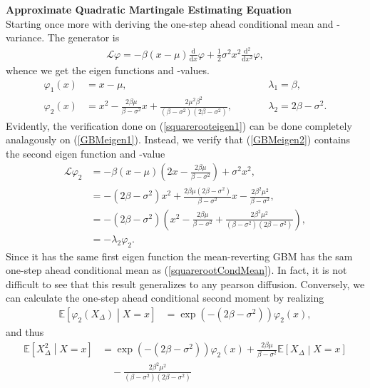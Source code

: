 \noindent \textbf{Approximate Quadratic Martingale Estimating Equation}\\
\noindent Starting once more with deriving the one-step ahead conditional mean and - variance. The generator is
\begin{align}
    \mathcal{L}\varphi = -\beta\left(x - \mu\right)\frac{\mathrm{d}}{\mathrm{d}x}\varphi + \frac{1}{2}\sigma^2 x^2 \frac{\mathrm{d}^2}{\mathrm{d}x^2}\varphi,
\end{align}
whence we get the eigen functions and -values.
\begin{align}
    \varphi_1(x) &= x - \mu, \qquad &&\lambda_1 = \beta, \label{GBMeigen1} \\
    \varphi_2(x) &= x^2 - \frac{2\beta\mu}{\beta - \sigma^2}x + \frac{2\mu^2\beta^2}{\left(\beta - \sigma^2\right)\left(2\beta - \sigma^2\right)}, \qquad &&\lambda_2 = 2\beta - \sigma^2 \label{GBMeigen2}.
\end{align}
Evidently, the verification done on (\ref{squarerooteigen1}) can be done completely analagously on (\ref{GBMeigen1}). Instead, we verify that (\ref{GBMeigen2}) contains the second eigen function and -value
\begin{align}
    \mathcal{L}\varphi_2 & = -\beta\left(x-\mu\right)\left(2x - \frac{2\beta\mu}{\beta-\sigma^2}\right) + \sigma^2x^2,\\
    &=-\left(2\beta - \sigma^2\right)x^2 + \frac{2\beta\mu\left(2\beta-\sigma^2\right)}{\beta - \sigma^2}x - \frac{2\beta^2\mu^2}{\beta - \sigma^2}, \\
    &= -\left(2\beta -\sigma^2\right)\left(x^2 - \frac{2\beta\mu}{\beta-\sigma^2} + \frac{2\beta^2\mu^2}{\left(\beta-\sigma^2\right)\left(2\beta-\sigma^2\right)}\right),\\
    &= - \lambda_2 \varphi_2.
\end{align}
Since it has the same first eigen function the mean-reverting GBM has the sam one-step ahead conditional mean as (\ref{squarerootCondMean}). In fact, it is not difficult to see that this result generalizes to any pearson diffusion. Conversely, we can calculate the one-step ahead conditional second moment by realizing
\begin{align}
    \mathbb{E}\left[\varphi_2(X_\Delta)\middle|X = x\right] &= \exp\left(-\left(2\beta - \sigma^2\right)\right)\varphi_2(x),
\end{align}
and thus
\begin{align}
    \mathbb{E}\left[X_\Delta^2 \middle| X = x\right] &= \exp\left(-\left(2\beta - \sigma^2\right)\right)\varphi_2(x) + \frac{2\beta\mu}{\beta-\sigma^2} \mathbb{E}\left[X_\Delta\middle|X=x\right] \nonumber \\
    &\quad - \frac{2\beta^2\mu^2}{\left(\beta-\sigma^2\right)\left(2\beta-\sigma^2\right)}
\end{align}
